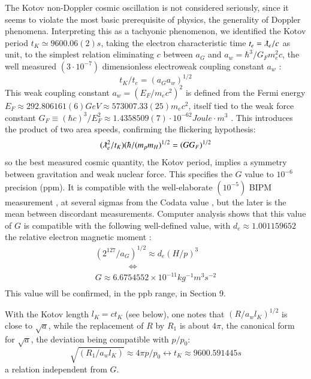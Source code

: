 \documentclass[twoside,draft]{article}
\begin{document}
\begin{sloppypar}
The Kotov non-Doppler cosmic oscillation \cite{Kotov1} is not considered seriously, since it seems to violate the most basic prerequisite of physics, the generality of Doppler phenomena. Interpreting this as a tachyonic phenomenon, we identified the Kotov period $t_{K} \simeq 9600.06(2) s$, taking the electron characteristic time $t_{e} = \lambdabar_{e} /c$ as unit, to the simplest relation eliminating $c$ between $a_{G}$ and $a_{w}=
\hbar^{3} /G_{F} m_{e}^{2} c$, the well measured $(3\cdot 10^{-7})$ dimensionless electroweak coupling constant $a_{w}$ :
\begin{equation}
t_{K} / t_{e} = (a_{G} a_{w})^{1/2}
\end{equation}
This weak coupling constant \cite{Carr} $a_{w} = (E_{F} /m_{e} c^{2} )^{2}$ is defined from the Fermi energy 
$
E_{F} \approx 292.806161(6) GeV \approx 573007.33(25) m_{e} c^{2}
$, itself tied to the weak force constant 
$
G_{F} \equiv (\hbar c)^{3} /E_{F}^{2} \approx
1.4358509(7) \cdot 10^{-62} Joule \cdot m^{3}
$
. This introduces the product of two area speeds, confirming the flickering hypothesis:
\begin{equation}
(\lambdabar_{e}^2/t_{K} )(\hbar/(m_{p} m_{H})^{1/2} = (GG_{F})^{1/2}
\end{equation}
so the best measured cosmic quantity, the Kotov period, implies a symmetry between gravitation and weak nuclear force. This specifies the $G$ value to $10^{-6}$ precision (ppm). It is compatible with the well-elaborate $(10^{-5})$ BIPM measurement \cite{Quinn}, at several sigmas from the Codata value \cite{Tanabashi}, but the later is the mean between discordant measurements. Computer analysis shows that this value of $G$ is compatible with the following well-defined value, with $d_{e} \approx 1.001159652$ the relative electron magnetic moment :
$$\begin{array}{ll}
(2^{127} /a_{G} )^{1/2} \approx d_{e} (H/p)^{3} \\
\qquad  \qquad \Leftrightarrow \\
G \approx 6.6754552 \times 10^{-11} kg^{-1} m^{3} s^{-2} \\
\end{array}$$
This value will be confirmed, in the ppb range, in Section 9.

With the Kotov length $l_{K} = ct_{K}$ (see below), one notes that $(R/a_w l_K)^{1/2} $ is close to $\sqrt{a}$, while the replacement of $R$ by $R_{1}$ is about $4\pi$, the canonical form for $\sqrt{a}$, the deviation being compatible with $p/p_{0}$:
$$\sqrt{(R_{1} /a_{w} l_{K})} \approx 4\pi p/p_{0} \leftrightarrow t_{K} \approx 9 600.591445 s$$ a relation independent from $G$. 


\end{sloppypar}
\end{document}
